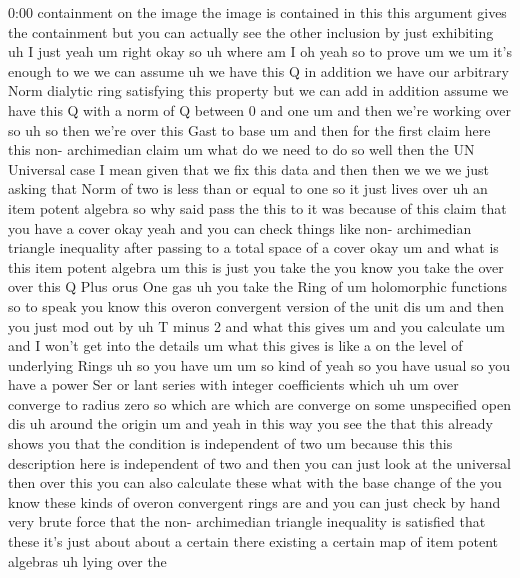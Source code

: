 \begin{unfinished}{0:00}
containment  on  the  image  the  image  is
contained  in  this  this  argument  gives
the  containment  but  you  can  actually  see
the  other  inclusion  by  just  exhibiting
uh  I  just
yeah  um  right  okay
so  uh  where  am  I  oh  yeah  so  to  prove  um
we  um  it's  enough  to  we  we  can
assume  uh  we  have  this  Q  in  addition  we
have  our  arbitrary  Norm  dialytic  ring
satisfying  this  property  but  we  can  add
in  addition  assume  we  have  this  Q  with  a
norm  of  Q  between  0  and
one  um  and  then  we're  working  over
so  uh  so  then  we're  over  this  Gast  to
base
um  and  then  for  the  first  claim  here
this  non-  archimedian
claim  um  what  do  we  need  to  do  so  well
then  the  UN  Universal
case  I  mean  given  that  we  fix  this  data
and  then  then  we  we  we  just  asking  that
Norm  of  two  is  less  than  or  equal  to  one
so  it  just  lives  over  uh  an  item  potent
algebra
so
why  said  pass
the  this  to  it  was  because  of  this  claim
that  you  have  a
cover  okay
yeah  and  you  can  check  things  like  non-
archimedian  triangle  inequality  after
passing  to  a  total  space  of  a  cover  okay
um  and  what  is  this  item  potent
algebra  um  this  is  just  you  take  the  you
know  you  take  the  over  over  this  Q  Plus
orus  One  gas  uh  you  take  the  Ring  of  um
holomorphic  functions  so  to  speak  you
know  this  overon  convergent  version  of
the  unit  dis  um  and  then  you  just  mod
out  by  uh  T  minus
2
and  what  this  gives  um  and  you
calculate  um  and  I  won't  get  into  the
details  um  what  this  gives  is  like  a  on
the  level  of  underlying  Rings  uh  so  you
have
um
um  so  kind  of  yeah  so  you  have  usual  so
you  have  a  power  Ser  or  lant  series  with
integer  coefficients  which  uh
um  over  converge  to  radius  zero  so  which
are  which  are  converge  on  some
unspecified  open  dis  uh  around  the
origin
um  and  yeah  in  this  way  you  see  the  that
this  already  shows  you  that  the
condition  is  independent  of
two  um  because  this  this  description
here  is  independent  of  two  and  then  you
can  just  look  at  the  universal  then  over
this  you  can  also  calculate  these  what
with  the  base  change  of  the  you  know
these  kinds  of  overon  convergent  rings
are  and  you  can  just  check  by  hand  very
brute  force  that  the  non-  archimedian
triangle  inequality  is  satisfied  that
these  it's  just  about  about  a  certain
there  existing  a  certain  map  of  item
potent  algebras  uh  lying  over  the

\end{unfinished}
